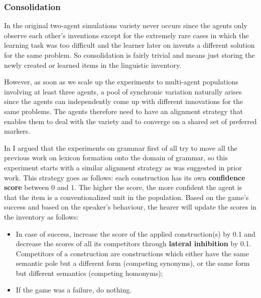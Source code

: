 \subsubsection{Consolidation}
 In the original two-agent simulations variety never occurs since the agents only observe each other's inventions except for the extremely rare cases in which the learning task was too difficult and the learner later on invents a different solution for the same problem. So consolidation is fairly trivial and means just storing the newly created or learned items in the linguistic inventory.

However, as soon as we scale up the experiments to multi-agent populations involving at least three agents, a pool of synchronic variation naturally arises since the agents can independently come up with different innovations for the same problems. The agents therefore need to have an alignment strategy that enables them to deal with the variety and to converge on a shared set of preferred markers.



In  I argued that the experiments on grammar first of all try to move all the previous work on lexicon formation onto the domain of grammar, so this experiment starts with a similar alignment strategy as was suggested in prior work. This strategy goes as follows: each construction has its own {\bfseries confidence score} between 0 and 1. The higher the score, the more confident the agent is that the item is a conventionalized unit in the population. Based on the game's success and based on the speaker's behaviour, the hearer will update the scores in the inventory as follows:

\begin{itemize}
\item In case of success, increase the score of the applied construction(s) by 0.1 and decrease the scores of all its competitors through {\bfseries lateral inhibition} by 0.1. Competitors of a construction are constructions which either have the same semantic pole but a different form (competing synonyms), or the same form but different semantics (competing homonyms);
\item If the game was a failure, do nothing.
\end{itemize}

